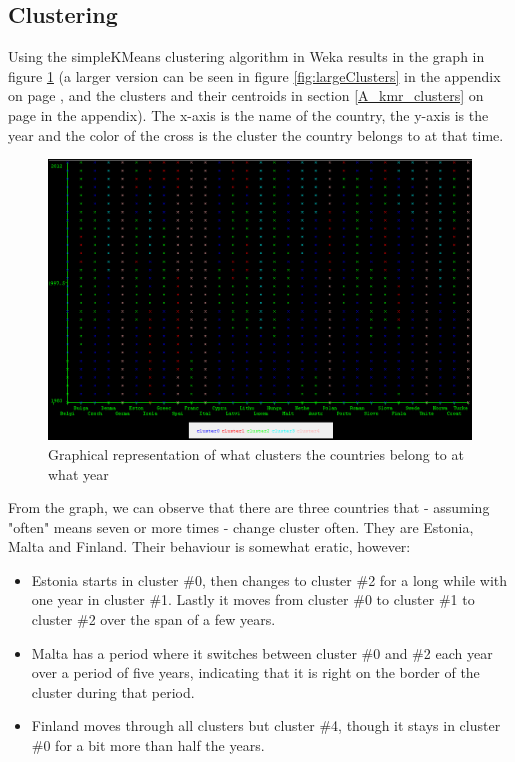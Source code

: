 \subsection{Clustering}
\label{Res_Clu}

Using the simpleKMeans clustering algorithm in Weka results in the graph in figure \ref{fig:clusters} (a larger version can be seen in figure \ref{fig:largeClusters} in the appendix on page \pageref{fig:largeClusters}, and the clusters and their centroids in section \ref{A_kmr_clusters} on page \pageref{A_kmr_clusters} in the appendix). The x-axis is the name of the country, the y-axis is the year and the color of the cross is the cluster the country belongs to at that time.

\begin{figure}[h!]
  \centering
\includegraphics[width=\textwidth]{Appendix/Images/kMeans}
\caption{Graphical representation of what clusters the countries belong to at what year}
\label{fig:clusters}
\end{figure}

From the graph, we can observe that there are three countries that - assuming "often" means seven or more times - change cluster often. They are Estonia, Malta and Finland. Their behaviour is somewhat eratic, however:
\begin{itemize}
	\item Estonia starts in cluster \#0, then changes to cluster \#2 for a long while with one year in cluster \#1. Lastly it moves from cluster \#0 to cluster \#1 to cluster \#2 over the span of a few years.

	\item Malta has a period where it switches between cluster \#0 and \#2 each year over a period of five years, indicating that it is right on the border of the cluster during that period.

	\item Finland moves through all clusters but cluster \#4, though it stays in cluster \#0 for a bit more than half the years.
\end{itemize}

